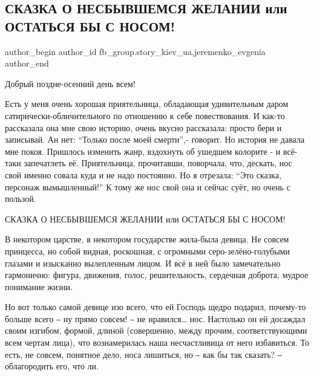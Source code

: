  
 
 
 
 
 
\subsection{СКАЗКА О НЕСБЫВШЕМСЯ ЖЕЛАНИИ или ОСТАТЬСЯ БЫ С НОСОМ!}
\label{sec:18_11_2021.fb.fb_group.story_kiev_ua.2.ostatjsja_s_nosom_skazka}
 
\ifcmt
 author_begin
   author_id fb_group.story_kiev_ua,jeremenko_evgenia
 author_end
\fi

Добрый поздне-осенний день всем!

Есть у меня очень хорошая приятельница, обладающая удивительным даром
сатирически-обличительного по отношению к себе повествования. И как-то
рассказала она мне свою историю, очень вкусно рассказала: просто бери и
записывай. Ан нет: \enquote{Только после моей смерти},- говорит. Но история не давала
мне покоя. Пришлось изменить жанр, вздохнуть об ушедшем колорите - и всё-таки
запечатлеть её. Приятельница, прочитавши, поворчала, что, дескать, нос свой
именно совала куда и не надо постоянно. Но я отрезала: \enquote{Это сказка, персонаж
вымышленный!} К тому же нос свой она и сейчас суёт, но очень с пользой.

СКАЗКА О НЕСБЫВШЕМСЯ ЖЕЛАНИИ или ОСТАТЬСЯ БЫ С НОСОМ! 

В некотором царстве, в некотором государстве жила-была девица. Не совсем
принцесса, но собой видная, роскошная, с огромными серо-зелёно-голубыми глазами
и изысканно вылепленным лицом. И всё в ней было замечательно гармонично:
фигура, движения, голос, решительность, сердечная доброта, мудрое понимание
жизни. 

Но вот только самой девице изо всего, что ей Господь щедро подарил, почему-то
больше всего ‒ ну прямо совсем! ‒ не нравился… нос. Настолько он ей досаждал
своим изгибом, формой, длиной (совершенно, между прочим, соответствующими всем
чертам лица), что вознамерилась наша несчастливица от него избавиться. То есть,
не совсем, понятное дело, носа лишиться, но ‒ как бы так сказать? ‒
облагородить его, что ли. 

